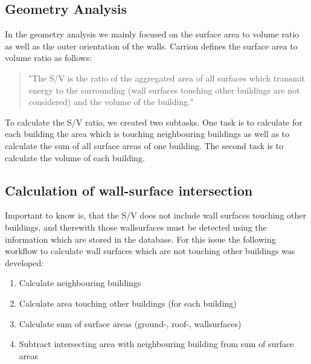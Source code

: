 \subsection{Geometry Analysis}
In the geometry analysis we mainly focused on the surface area to volume ratio as well as the outer orientation of the walls. Carrion \citep{carrion2010} defines the surface area to volume ratio as follows:
\begin{quote}
"The S/V is the ratio of the aggregated area of all surfaces which transmit energy to the surrounding (wall surfaces touching other buildings are not considered) and the volume of the building."
\end{quote}
To calculate the S/V ratio, we created two subtasks. One task is to calculate for each building the area which is touching neighbouring buildings as well as to calculate the sum of all surface areas of one building. The second task is to calculate the volume of each building.

\subsection{Calculation of wall-surface intersection}
Important to know is, that the S/V does not include wall surfaces touching other buildings, and therewith those wallsurfaces must be detected using the information which are stored in the database. For this issue the following workflow to calculate wall surfaces which are not touching other buildings was developed:
\begin{enumerate}
\item Calculate neighbouring buildings
\item Calculate area touching other buildings (for each building)
\item Calculate sum of surface areas (ground-, roof-, wallsurfaces)
\item Subtract intersecting area with neighbouring building from sum of surface areas
\end{enumerate}

